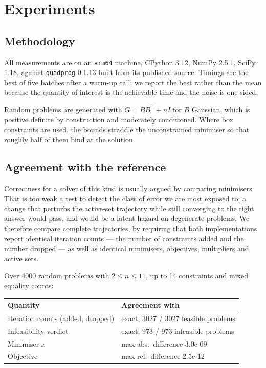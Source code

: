 \documentclass[11pt,a4paper]{article}
\theoremstyle{plain}
\theoremstyle{remark}
\newcommand{\T}{^{\mathsf{T}}}
\begin{document}
\section{Experiments}
\label{sec:experiments}

\subsection{Methodology}

All measurements are on an \texttt{arm64} machine, CPython 3.12, NumPy 2.5.1,
SciPy 1.18, against \texttt{quadprog} 0.1.13 built from its published source.
Timings are the best of five batches after a warm-up call; we report the best
rather than the mean because the quantity of interest is the achievable time and
the noise is one-sided.

Random problems are generated with $G = BB\T + nI$ for $B$ Gaussian, which is
positive definite by construction and moderately conditioned. Where box
constraints are used, the bounds straddle the unconstrained minimiser so that
roughly half of them bind at the solution.

\subsection{Agreement with the reference}
\label{sec:agreement}

Correctness for a solver of this kind is usually argued by comparing minimisers.
That is too weak a test to detect the class of error we are most exposed to: a
change that perturbs the active-set trajectory while still converging to the
right answer would pass, and would be a latent hazard on degenerate problems. We
therefore compare complete trajectories, by requiring that both implementations
report identical iteration counts --- the number of constraints added and the
number dropped --- as well as identical minimisers, objectives, multipliers and
active sets.

Over 4000 random problems with $2 \le n \le 11$, up to 14 constraints and mixed
equality counts:

\begin{center}
\begin{tabular}{ll}
  \toprule
  Quantity & Agreement with \citep{quadprogpy} \\
  \midrule
  Iteration counts (added, dropped) & exact, 3027 / 3027 feasible problems \\
  Infeasibility verdict             & exact, 973 / 973 infeasible problems \\
  Minimiser $x$                     & max abs.\ difference 3.0e-09 \\
  Objective                         & max rel.\ difference 2.5e-12 \\
  \bottomrule
\end{tabular}
\end{center}
\end{document}
